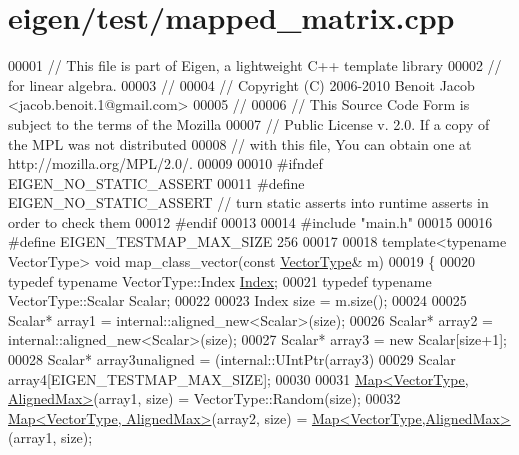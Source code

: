 \hypertarget{eigen_2test_2mapped__matrix_8cpp_source}{}\section{eigen/test/mapped\+\_\+matrix.cpp}
\label{eigen_2test_2mapped__matrix_8cpp_source}

\begin{DoxyCode}
00001 \textcolor{comment}{// This file is part of Eigen, a lightweight C++ template library}
00002 \textcolor{comment}{// for linear algebra.}
00003 \textcolor{comment}{//}
00004 \textcolor{comment}{// Copyright (C) 2006-2010 Benoit Jacob <jacob.benoit.1@gmail.com>}
00005 \textcolor{comment}{//}
00006 \textcolor{comment}{// This Source Code Form is subject to the terms of the Mozilla}
00007 \textcolor{comment}{// Public License v. 2.0. If a copy of the MPL was not distributed}
00008 \textcolor{comment}{// with this file, You can obtain one at http://mozilla.org/MPL/2.0/.}
00009 
00010 \textcolor{preprocessor}{#ifndef EIGEN\_NO\_STATIC\_ASSERT}
00011 \textcolor{preprocessor}{#define EIGEN\_NO\_STATIC\_ASSERT // turn static asserts into runtime asserts in order to check them}
00012 \textcolor{preprocessor}{#endif}
00013 
00014 \textcolor{preprocessor}{#include "main.h"}
00015 
00016 \textcolor{preprocessor}{#define EIGEN\_TESTMAP\_MAX\_SIZE 256}
00017 
00018 \textcolor{keyword}{template}<\textcolor{keyword}{typename} VectorType> \textcolor{keywordtype}{void} map\_class\_vector(\textcolor{keyword}{const} \hyperlink{struct_vector_type}{VectorType}& m)
00019 \{
00020   \textcolor{keyword}{typedef} \textcolor{keyword}{typename} VectorType::Index \hyperlink{namespace_eigen_a62e77e0933482dafde8fe197d9a2cfde}{Index};
00021   \textcolor{keyword}{typedef} \textcolor{keyword}{typename} VectorType::Scalar Scalar;
00022 
00023   Index size = m.size();
00024 
00025   Scalar* array1 = internal::aligned\_new<Scalar>(size);
00026   Scalar* array2 = internal::aligned\_new<Scalar>(size);
00027   Scalar* array3 = \textcolor{keyword}{new} Scalar[size+1];
00028   Scalar* array3unaligned = (internal::UIntPtr(array3)%
00029   Scalar  array4[EIGEN\_TESTMAP\_MAX\_SIZE];
00030 
00031   \hyperlink{group___core___module_class_eigen_1_1_map}{Map<VectorType, AlignedMax>}(array1, size) = VectorType::Random(size);
00032   \hyperlink{group___core___module_class_eigen_1_1_map}{Map<VectorType, AlignedMax>}(array2, size) = 
      \hyperlink{group___core___module_class_eigen_1_1_map}{Map<VectorType,AlignedMax>}(array1, size);

\end{DoxyCode}
